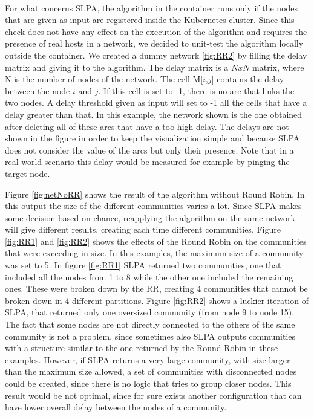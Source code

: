 \paragraph{}
For what concerns SLPA, the algorithm in the container runs only if the nodes that
are given as input are registered inside the Kubernetes cluster. Since this check does not have
any effect on the execution of the algorithm and requires the presence of real hosts in a network,
we decided to unit-test the algorithm locally outside the container.
We created a dummy network \ref{fig:RR2} by filling the delay matrix and giving it to the algorithm.
The delay matrix is a  $NxN$ matrix, where N is the number of nodes of the network.
The cell M[$i$,$j$] contains the delay between the node $i$ and $j$. If this
cell is set to -1, there is no arc that links the two nodes. A delay threshold given as input will set to -1
all the cells that have a delay greater than that. In this example, the network shown is the one obtained after 
deleting all of these arcs that have a too high delay. The delays are not shown in the figure in order
to keep the visualization simple and because SLPA does not consider the value of the arcs but only their presence.
Note that in a real world scenario this delay would be measured for example by pinging the target node.
\par
Figure \ref{fig:netNoRR} shows the result of the algorithm without Round Robin. In this output the size of the 
different communities varies a lot. Since SLPA makes some decision based on chance, reapplying the
algorithm on the same network will give different results, creating each time different communities.
Figure \ref{fig:RR1} and \ref{fig:RR2} shows the effects of the Round Robin on the communities that were exceeding 
in size. In this examples, the maximum size of a community was set to 5. In figure \ref{fig:RR1} SLPA returned
two communities, one that included all the nodes from 1 to 8 while the other one included the remaining ones.
These were broken down  by the RR, creating 4 communities that cannot be broken down in 4 different partitions.
Figure \ref{fig:RR2} shows a luckier iteration of SLPA, that returned only one oversized community (from node 9
to node 15). 
\\
The fact that some nodes are not directly connected to the others of the same community is not a problem,
since sometimes also SLPA outputs communities with a structure similar to the one returned by the Round Robin in these examples.
However, if SLPA returns a very large community, with size larger than the maximum size allowed, a set of communities
with disconnected nodes could be created, since there is no logic that tries to group closer nodes.
This result would be not optimal, since for sure exists another configuration that can have lower
overall delay between the nodes of a community.


